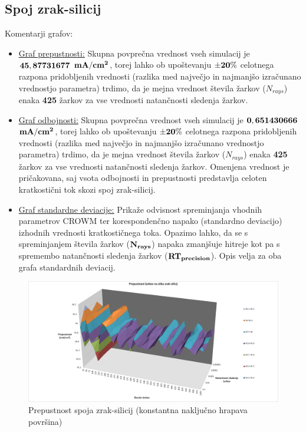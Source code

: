 \documentclass[a4paper,twoside,openright,12pt,slovene]{book}
\begin{document}
\subsection{Spoj zrak-silicij}

Komentarji grafov:
\begin{itemize}
    \item \underline{\hyperref[fig:pre_air_Si]{Graf prepustnosti:}} Skupna povprečna vrednost vseh simulacij je $\bf 45,87731677$ $\bf mA/cm^2$, torej lahko ob upoštevanju $\bf \pm 20\%$ celotnega razpona pridobljenih vrednosti (razlika med največjo in najmanjšo izračunano vrednostjo parametra) trdimo, da je mejna vrednost števila žarkov ($N_{rays}$) enaka \textbf{425} žarkov za vse vrednosti natančnosti sledenja žarkov.

    \item \underline{\hyperref[fig:odb_air_Si]{Graf odbojnosti:}} Skupna povprečna vrednost vseh simulacij je $\bf 0,651430666$ $\bf mA/cm^2$, torej lahko ob upoštevanju $\bf \pm 20\%$ celotnega razpona pridobljenih vrednosti (razlika med največjo in najmanjšo izračunano vrednostjo parametra) trdimo, da je mejna vrednost števila žarkov ($N_{rays}$) enaka \textbf{425} žarkov za vse vrednosti natančnosti sledenja žarkov. Omenjena vrednost je pričakovana, saj vsota odbojnosti in prepustnosti predstavlja celoten kratkostični tok skozi spoj zrak-silicij.
    
    \item \underline{\hyperref[fig:std_air_Si]{Graf standardne deviacije:}} Prikaže odvisnost spreminjanja vhodnih parametrov CROWM ter korespondenčno napako (standardno deviacijo) izhodnih vrednosti kratkostičnega toka. Opazimo lahko, da se s spreminjanjem števila žarkov ($\bf N_{rays}$) napaka zmanjšuje hitreje kot pa s spremembo natančnosti sledenja žarkov ($\bf RT_{precision}$). Opis velja za oba grafa standardnih deviacij.
\end{itemize}

\begin{figure}[H]
    \centering
    \includegraphics[trim={40 5 20 1}, clip, width=150mm]{Slike/prepustnost3D_air_Si_contTexture.png}
    \caption{Prepustnost spoja zrak-silicij (konstantna naključno hrapava površina)}
    \label{fig:pre_air_Si}
\end{figure}
\end{document}
